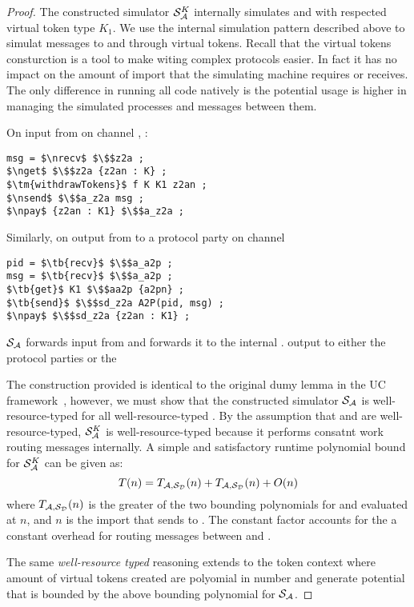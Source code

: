 \begin{proof}
The constructed simulator $\mathcal{S}_\mathcal{A}^K$ internally simulates \Dummysim and \Adversary with respected virtual token type $K_1$. 
We use the internal simulation pattern described above to simulat messages to \Dummysim and \Adversary through virtual tokens.
Recall that the virtual tokens consturction is a tool to make witing complex protocols easier.
In fact it has no impact on the amount of import that the simulating machine requires or receives.
The only difference in running all code natively is the potential usage is higher in managing the simulated processes and messages between them.

On input from \Environment on channel , \Simulator:
\begin{lstlisting}[basicstyle=\small\BeraMonottFamily, frame=single,  mathescape, label={lst:sim}]
msg = $\nrecv$ $\$$z2a ;
$\nget$ $\$$z2a {z2an : K} ;
$\tm{withdrawTokens}$ f K K1 z2an ;
$\nsend$ $\$$a_z2a msg ;
$\npay$ {z2an : K1} $\$$a_z2a ; 
\end{lstlisting}

Similarly, on output from \Adversary to a protocol party on channel 
\begin{lstlisting}[basicstyle=\small\BeraMonottFamily, frame=single,  mathescape]
pid = $\tb{recv}$ $\$$a_a2p ;
msg = $\tb{recv}$ $\$$a_a2p ;
$\tb{get}$ K1 $\$$aa2p {a2pn} ;
$\tb{send}$ $\$$sd_z2a A2P(pid, msg) ;
$\npay$ $\$$sd_z2a {z2an : K1} ;
\end{lstlisting}

$\mathcal{S}_\mathcal{A}$ forwards input from \Environment and forwards it to the internal \Adversary. 
\Adversary output to either the protocol parties or the 

The construction provided is identical to the original dumy lemma in the UC framework~\cite{uc}, however, we must show that the constructed simulator $\mathcal{S}_\mathcal{A}$ is well-resource-typed for all well-resource-typed \Adversary.
By the assumption that \Adversary and \Dummysim are well-resource-typed, $\mathcal{S}_\mathcal{A}^K$ is well-resource-typed because it performs consatnt work routing messages internally. 
A simple and satisfactory runtime polynomial bound for $\mathcal{S}_\mathcal{A}^K$ can be given as:
\[
T(n) = T_{\mathcal{A},\mathcal{S}_{\mathcal{D}}}(n) + T_{\mathcal{A},\mathcal{S}_{\mathcal{D}}}(n) + O(n)
\]
where $T_{\mathcal{A},\mathcal{S}_{\mathcal{D}}}(n)$ is the greater of the two bounding polynomials for \Dummysim and \Adversary evaluated at $n$, and $n$ is the import that \Environment sends to \Adversary. 
The constant factor accounts for the a constant overhead for routing messages between \Dummysim and \Adversary.

The same \textit{well-resource typed} reasoning extends to the token context where amount of virtual tokens created are polyomial in number and generate potential that is bounded by the above bounding polynomial for $\mathcal{S}_\mathcal{A}$.

\end{proof}

